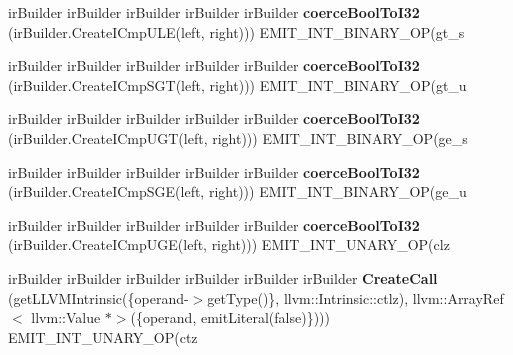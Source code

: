\begin{DoxyCompactItemize}
ir\+Builder ir\+Builder ir\+Builder ir\+Builder ir\+Builder {\bfseries coerce\+Bool\+To\+I32} (ir\+Builder.\+Create\+I\+Cmp\+U\+LE(left, right))) E\+M\+I\+T\+\_\+\+I\+N\+T\+\_\+\+B\+I\+N\+A\+R\+Y\+\_\+\+OP(gt\+\_\+s
\item 
\mbox{\label{struct_l_l_v_m_j_i_t_1_1_emit_function_context_ae629541240a1fd93001e4fb768c27fe4}} 
ir\+Builder ir\+Builder ir\+Builder ir\+Builder ir\+Builder {\bfseries coerce\+Bool\+To\+I32} (ir\+Builder.\+Create\+I\+Cmp\+S\+GT(left, right))) E\+M\+I\+T\+\_\+\+I\+N\+T\+\_\+\+B\+I\+N\+A\+R\+Y\+\_\+\+OP(gt\+\_\+u
\item 
\mbox{\label{struct_l_l_v_m_j_i_t_1_1_emit_function_context_ae29e8a5d8611ede29602c4e6cf1de3cb}} 
ir\+Builder ir\+Builder ir\+Builder ir\+Builder ir\+Builder {\bfseries coerce\+Bool\+To\+I32} (ir\+Builder.\+Create\+I\+Cmp\+U\+GT(left, right))) E\+M\+I\+T\+\_\+\+I\+N\+T\+\_\+\+B\+I\+N\+A\+R\+Y\+\_\+\+OP(ge\+\_\+s
\item 
\mbox{\label{struct_l_l_v_m_j_i_t_1_1_emit_function_context_a72f4c6a36c2292b06e3c34781f9c6add}} 
ir\+Builder ir\+Builder ir\+Builder ir\+Builder ir\+Builder {\bfseries coerce\+Bool\+To\+I32} (ir\+Builder.\+Create\+I\+Cmp\+S\+GE(left, right))) E\+M\+I\+T\+\_\+\+I\+N\+T\+\_\+\+B\+I\+N\+A\+R\+Y\+\_\+\+OP(ge\+\_\+u
\item 
\mbox{\label{struct_l_l_v_m_j_i_t_1_1_emit_function_context_a030e4400585d5ba99f9ac52325bb13d9}} 
ir\+Builder ir\+Builder ir\+Builder ir\+Builder ir\+Builder {\bfseries coerce\+Bool\+To\+I32} (ir\+Builder.\+Create\+I\+Cmp\+U\+GE(left, right))) E\+M\+I\+T\+\_\+\+I\+N\+T\+\_\+\+U\+N\+A\+R\+Y\+\_\+\+OP(clz
\item 
\mbox{\label{struct_l_l_v_m_j_i_t_1_1_emit_function_context_a831018eed0be5ccf94201190fbcfbf11}} 
ir\+Builder ir\+Builder ir\+Builder ir\+Builder ir\+Builder ir\+Builder {\bfseries Create\+Call} (get\+L\+L\+V\+M\+Intrinsic(\{operand-\/$>$get\+Type()\}, llvm\+::\+Intrinsic\+::ctlz), llvm\+::\+Array\+Ref$<$ llvm\+::\+Value $\ast$$>$(\{operand, emit\+Literal(false)\}))) E\+M\+I\+T\+\_\+\+I\+N\+T\+\_\+\+U\+N\+A\+R\+Y\+\_\+\+OP(ctz
\item 
$$
\end{DoxyCompactItemize}
